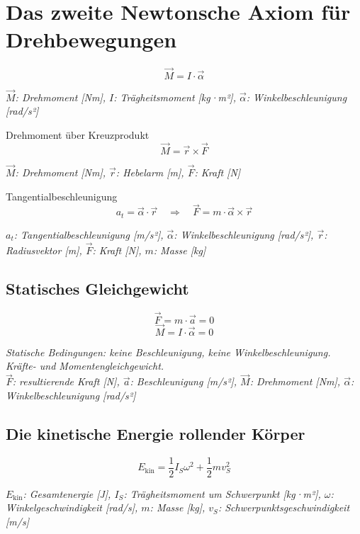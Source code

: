 \documentclass[a5paper,10pt]{article}
\newenvironment{displayformula}
{
	\begin{framed}
		\color{formulaColor}
	}
	{\end{framed}}
\newcommand{\formulalegend}[1]{%
	\par\vspace{0.5ex}%
	{{\color{legendColor}\RaggedRight\small\textit{#1}}}%
	\par\vspace{1.5ex}%
}
\begin{document}
\section{Das zweite Newtonsche Axiom für Drehbewegungen}

\begin{displayformula}
	\[
	\vec{M} = I \cdot \vec{\alpha}
	\]
\end{displayformula}
\formulalegend{
	\( \vec{M} \): Drehmoment [Nm], \( I \): Trägheitsmoment [kg·m²], \( \vec{\alpha} \): Winkelbeschleunigung [rad/s²]
}

\begin{displayformula}
	Drehmoment über Kreuzprodukt
	\[
	\vec{M} = \vec{r} \times \vec{F}
	\]
\end{displayformula}
\formulalegend{
	\( \vec{M} \): Drehmoment [Nm], \( \vec{r} \): Hebelarm [m], \( \vec{F} \): Kraft [N]
}

\begin{displayformula}
	Tangentialbeschleunigung
	\[
	a_t = \vec{\alpha} \cdot \vec{r} \quad \Rightarrow \quad \vec{F} = m \cdot \vec{\alpha} \times \vec{r}
	\]
\end{displayformula}
\formulalegend{
	\( a_t \): Tangentialbeschleunigung [m/s²], \( \vec{\alpha} \): Winkelbeschleunigung [rad/s²], \( \vec{r} \): Radiusvektor [m], \( \vec{F} \): Kraft [N], \( m \): Masse [kg]
}
\newpage
\subsection{Statisches Gleichgewicht}

\begin{displayformula}
	\[
	\vec{F} = m \cdot \vec{a} = 0
	\]
	\[
	\vec{M} = I \cdot \vec{\alpha} = 0
	\]
\end{displayformula}
\formulalegend{
	Statische Bedingungen: keine Beschleunigung, keine Winkelbeschleunigung. Kräfte- und Momentengleichgewicht.\\
	\( \vec{F} \): resultierende Kraft [N], \( \vec{a} \): Beschleunigung [m/s²], \( \vec{M} \): Drehmoment [Nm], \( \vec{\alpha} \): Winkelbeschleunigung [rad/s²]
}
\newpage
\subsection{Die kinetische Energie rollender Körper}

\begin{displayformula}
	\[
	E_{\text{kin}} = \frac{1}{2} I_S \omega^2 + \frac{1}{2} m v_S^2
	\]
\end{displayformula}
\formulalegend{
	\( E_{\text{kin}} \): Gesamtenergie [J], \( I_S \): Trägheitsmoment um Schwerpunkt [kg·m²], \( \omega \): Winkelgeschwindigkeit [rad/s], \( m \): Masse [kg], \( v_S \): Schwerpunktsgeschwindigkeit [m/s]
}
\end{document}
